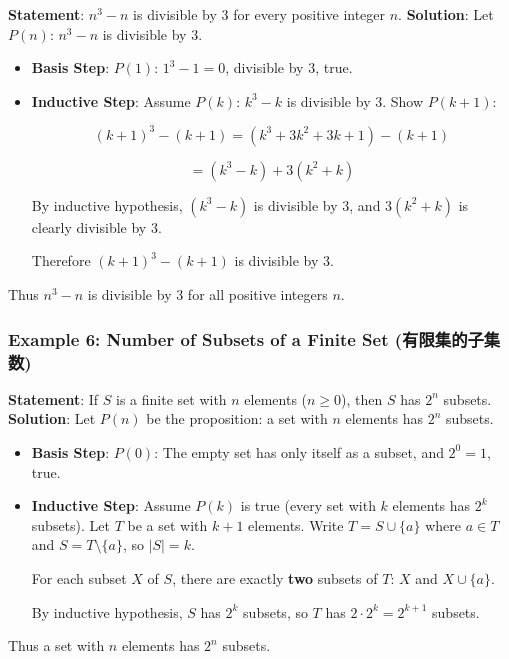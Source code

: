 \documentclass[10pt,a4paper,openany]{ctexbook}
\theoremstyle{definition}
\theoremstyle{remark}
\begin{document}
\textbf{Statement}: $n^3 - n$ is divisible by $3$ for every positive integer $n$.
\textbf{Solution}:
Let $P(n)$: $n^3 - n$ is divisible by $3$.
\begin{itemize}
\item \textbf{Basis Step}: $P(1)$: $1^3 - 1 = 0$, divisible by $3$, true.
\item \textbf{Inductive Step}: Assume $P(k)$: $k^3 - k$ is divisible by $3$.
Show $P(k+1)$:

\[
(k+1)^3 - (k+1) = (k^3 + 3k^2 + 3k + 1) - (k+1)
\]

\[
= (k^3 - k) + 3(k^2 + k)
\]

By inductive hypothesis, $(k^3 - k)$ is divisible by $3$, and $3(k^2+k)$ is clearly divisible by $3$.

Therefore $(k+1)^3 - (k+1)$ is divisible by $3$.


\end{itemize}

Thus $n^3 - n$ is divisible by $3$ for all positive integers $n$.
\vspace{-2pt}

\subsubsection{Example 6: Number of Subsets of a Finite Set (有限集的子集数)}

\textbf{Statement}: If $S$ is a finite set with $n$ elements ($n \ge 0$), then $S$ has $2^n$ subsets.
\textbf{Solution}:
Let $P(n)$ be the proposition: a set with $n$ elements has $2^n$ subsets.
\begin{itemize}
\item \textbf{Basis Step}: $P(0)$: The empty set has only itself as a subset, and $2^0 = 1$, true.
\item \textbf{Inductive Step}: Assume $P(k)$ is true (every set with $k$ elements has $2^k$ subsets).
Let $T$ be a set with $k+1$ elements. Write $T = S \cup \{a\}$ where $a \in T$ and $S = T \setminus \{a\}$, so $|S| = k$.

For each subset $X$ of $S$, there are exactly \textbf{two} subsets of $T$: $X$ and $X \cup \{a\}$.

By inductive hypothesis, $S$ has $2^k$ subsets, so $T$ has $2 \cdot 2^k = 2^{k+1}$ subsets.


\end{itemize}

Thus a set with $n$ elements has $2^n$ subsets.
\vspace{-2pt}
\end{document}
